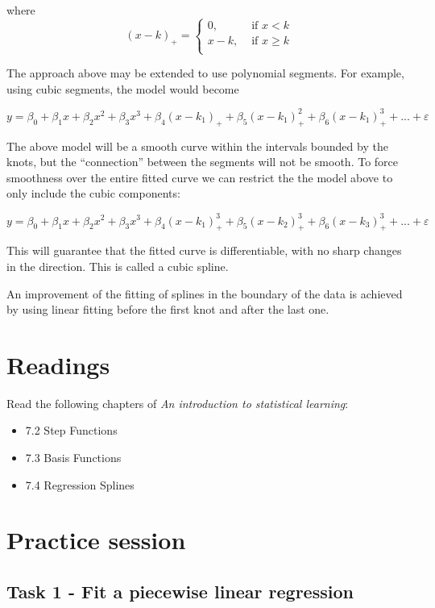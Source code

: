 \documentclass[
]{book}
\providecommand{\tightlist}{%
  \setlength{\itemsep}{0pt}\setlength{\parskip}{0pt}}
\begin{document}
where
\[(x-k)_{+} =  \begin{cases}
                  0, & \text{ if  } x < k \\
                  x-k, & \text{ if  } x \geq k\\
                 \end{cases} 
\]

The approach above may be extended to use polynomial segments. For example,
using cubic segments, the model would become

\[
y = \beta_0 + \beta_1 x +  \beta_2 x^2 + \beta_3 x^3 + \beta_4 (x-k_1)_{+} + \beta_5 (x-k_1)^2_{+} + \beta_6 (x-k_1)^3_{+}   + ... +  \varepsilon
\]

The above model will be a smooth curve within the intervals bounded by the
knots, but the ``connection'' between the segments will not be smooth. To force
smoothness over the entire fitted curve we can restrict the the model above to
only include the cubic components:

\[
y = \beta_0 + \beta_1 x +  \beta_2 x^2 + \beta_3 x^3 + \beta_4 (x-k_1)^3_{+} + \beta_5 (x-k_2)^3_{+} + \beta_6 (x-k_3)^3_{+}   + ... +  \varepsilon
\]

This will guarantee that the fitted curve is differentiable, with no sharp
changes in the direction. This is called a cubic spline.

An improvement of the fitting of splines in the boundary of the data is
achieved by using linear fitting before the first knot and after the last one.

\section{Readings}\label{PWR2}

Read the following chapters of \emph{An introduction to statistical learning}:

\begin{itemize}
\tightlist
\item
  7.2 Step Functions
\item
  7.3 Basis Functions
\item
  7.4 Regression Splines
\end{itemize}

\section{Practice session}\label{PWR3}

\subsection*{Task 1 - Fit a piecewise linear regression}\label{task-1---fit-a-piecewise-linear-regression}
\end{document}
